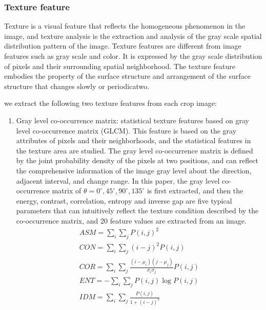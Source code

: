 \documentclass[11pt,en]{elegantpaper}
\begin{document}
\subsubsection{Texture feature}
Texture is a visual feature that reflects the homogeneous phenomenon in the image, and texture analysis is the extraction and analysis of the gray scale spatial distribution pattern of the image. Texture features are different from image features such as gray scale and color\cite{humeau2019texture}. It is expressed by the gray scale distribution of pixels and their surrounding spatial neighborhood. The texture feature embodies the property of the surface structure and arrangement of the surface structure that changes slowly or periodicatwo.

we extract the following two texture features from each crop image:
\begin{enumerate}
	\item Gray level co-occurrence matrix: statistical texture features based on gray level co-occurrence matrix (GLCM). This feature is based on the gray attributes of pixels and their neighborhoods, and the statistical features in the texture area are studied. The gray level co-occurrence matrix is defined by the joint probability density of the pixels at two positions, and can reflect the comprehensive information of the image gray level about the direction, adjacent interval, and change range. In this paper, the gray level co-occurrence matrix of $\theta = 0^{\circ},45^{\circ},90^{\circ},135^{\circ}$ is first extracted, and then the energy, contrast, correlation, entropy and inverse gap are five typical parameters that can intuitively reflect the texture condition described by the co-occurrence matrix, and 20 feature values are extracted from an image.
	\begin{gather}%
		ASM=\sum_{i} \sum_{j} P(i, j)^{2}\\
		CON=\sum_{i} \sum_{j}(i-j)^{2} P(i,j)\\
		COR=\sum_{i} \sum_{j} \frac{\left(i-\mu_{i}\right)\left(j-\mu_{j}\right)}{\sigma_{i} \sigma_{j}} P(i, j)\\
		ENT=-\sum_{i} \sum_{j} P(i, j) \log P(i, j)\\
		IDM=\sum_{i} \sum_{j} \frac{P(i, j)}{1+(i-j)^{2}}
	\end{gather}

\end{enumerate}
\end{document}
